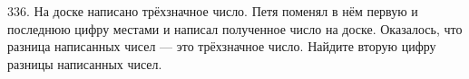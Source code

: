 336. На доске написано трёхзначное число. Петя поменял в нём первую и последнюю цифру местами и написал полученное число на доске. Оказалось, что разница написанных чисел --- это трёхзначное число. Найдите вторую цифру разницы написанных чисел.\\

